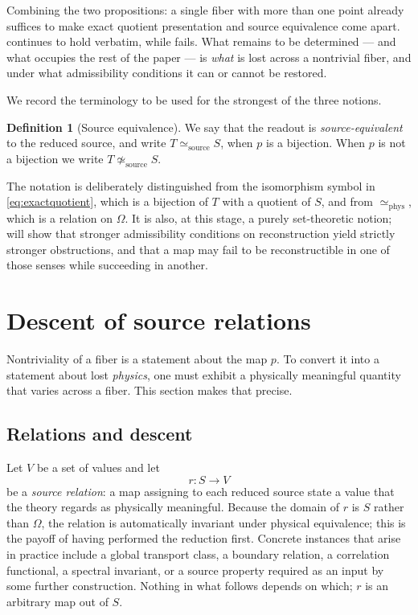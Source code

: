 \documentclass[11pt,reqno]{amsart}
\theoremstyle{plain}
\theoremstyle{definition}
\newtheorem{definition}[theorem]{Definition}
\theoremstyle{remark}
\newcommand{\phe}{\simeq_{\mathrm{phys}}}
\newcommand{\Om}{\Omega}
\begin{document}
Combining the two propositions: a single fiber with more than one point already suffices to make exact quotient presentation and source equivalence come apart.  continues to hold verbatim, while  fails. What remains to be determined --- and what occupies the rest of the paper --- is \emph{what} is lost across a nontrivial fiber, and under what admissibility conditions it can or cannot be restored.

We record the terminology to be used for the strongest of the three notions.

\begin{definition}[Source equivalence]
\label{def:sourceequiv}
We say that the readout is \emph{source-equivalent} to the reduced source, and write $T\simeq_{\mathrm{source}}S$, when $p$ is a bijection. When $p$ is not a bijection we write $T\not\simeq_{\mathrm{source}}S$.
\end{definition}

The notation is deliberately distinguished from the isomorphism symbol in \eqref{eq:exactquotient}, which is a bijection of $T$ with a quotient of $S$, and from $\phe$, which is a relation on $\Om$. It is also, at this stage, a purely set-theoretic notion;  will show that stronger admissibility conditions on reconstruction yield strictly stronger obstructions, and that a map may fail to be reconstructible in one of those senses while succeeding in another.

\section{Descent of source relations}
\label{sec:descent}

Nontriviality of a fiber is a statement about the map $p$. To convert it into a statement about lost \emph{physics}, one must exhibit a physically meaningful quantity that varies across a fiber. This section makes that precise.

\subsection{Relations and descent}

Let $V$ be a set of values and let
\begin{equation}
\label{eq:relation}
r\colon S\longrightarrow V
\end{equation}
be a \emph{source relation}: a map assigning to each reduced source state a value that the theory regards as physically meaningful. Because the domain of $r$ is $S$ rather than $\Om$, the relation is automatically invariant under physical equivalence; this is the payoff of having performed the reduction first. Concrete instances that arise in practice include a global transport class, a boundary relation, a correlation functional, a spectral invariant, or a source property required as an input by some further construction. Nothing in what follows depends on which; $r$ is an arbitrary map out of $S$.
\end{document}
